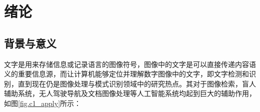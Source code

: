 ﻿%
%
%
%
%
%

\chapter{绪论}


    \section{背景与意义}

    文字是用来存储信息或记录语言的图像符号，图像中的文字是可以直接传递内容语义的重要信息源，而让计算机能够定位并理解数字图像中的文字，即文字检测和识别，直到现在仍是图像处理与模式识别领域中的研究热点。其对于图像检索，盲人辅助系统，无人驾驶导航及文档图像处理等人工智能系统均起到巨大的辅助作用，如图\ref{fig.c1_apply}所示：

